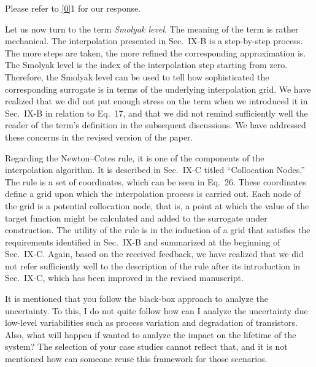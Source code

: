 \begin{authors}
Please refer to \cref{0}{1} for our response.

Let us now turn to the term \emph{Smolyak level}. The meaning of the term is
rather mechanical. The interpolation presented in Sec.~IX-B is a step-by-step
process. The more steps are taken, the more refined the corresponding
approximation is. The Smolyak level is the index of the interpolation step
starting from zero. Therefore, the Smolyak level can be used to tell how
sophisticated the corresponding surrogate is in terms of the underlying
interpolation grid. We have realized that we did not put enough stress on the
term when we introduced it in Sec.~IX-B in relation to Eq.~17, and that we did
not remind sufficiently well the reader of the term's definition in the
subsequent discussions. We have addressed these concerns in the revised version
of the paper.

Regarding the Newton--Cotes rule, it is one of the components of the
interpolation algorithm. It is described in Sec.~IX-C titled ``Collocation
Nodes.'' The rule is a set of coordinates, which can be seen in Eq.~26. These
coordinates define a grid upon which the interpolation process is carried out.
Each node of the grid is a potential collocation node, that is, a point at which
the value of the target function might be calculated and added to the surrogate
under construction. The utility of the rule is in the induction of a grid that
satisfies the requirements identified in Sec.~IX-B and summarized at the
beginning of Sec.~IX-C. Again, based on the received feedback, we have realized
that we did not refer sufficiently well to the description of the rule after its
introduction in Sec.~IX-C, which has been improved in the revised manuscript.

\begin{actions}


\end{actions}
\end{authors}

\begin{reviewer}
It is mentioned that you follow the black-box approach to analyze the
uncertainty. To this, I do not quite follow how can I analyze the uncertainty
due low-level variabilities such as process variation and degradation of
transistors. Also, what will happen if wanted to analyze the impact on the
lifetime of the system? The selection of your case studies cannot reflect that,
and it is not mentioned how can someone reuse this framework for those
scenarios.
\end{reviewer}

